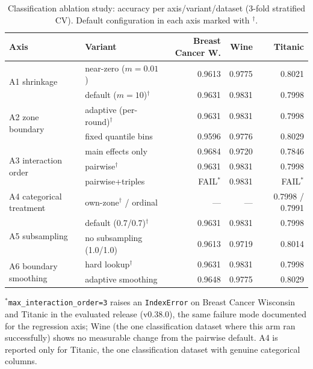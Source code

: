 \documentclass[11pt]{article}
\begin{document}
\begin{table}[t]
\centering
\small
\caption{Classification ablation study: accuracy per axis/variant/dataset
(3-fold stratified CV). Default configuration in each axis marked with
$^\dagger$.}
\label{tab:ablation-clf}
\begin{tabular}{llrrr}
\toprule
Axis & Variant & Breast Cancer W. & Wine & Titanic \\
\midrule
\multirow{2}{*}{A1 shrinkage}
 & near-zero ($m=0.01$)     & 0.9613 & 0.9775 & 0.8021 \\
 & default ($m=10$)$^\dagger$ & 0.9631 & 0.9831 & 0.7998 \\
\midrule
\multirow{2}{*}{A2 zone boundary}
 & adaptive (per-round)$^\dagger$ & 0.9631 & 0.9831 & 0.7998 \\
 & fixed quantile bins       & 0.9596 & 0.9776 & 0.8029 \\
\midrule
\multirow{3}{*}{A3 interaction order}
 & main effects only         & 0.9684 & 0.9720 & 0.7846 \\
 & pairwise$^\dagger$         & 0.9631 & 0.9831 & 0.7998 \\
 & pairwise+triples           & FAIL$^*$ & 0.9831 & FAIL$^*$ \\
\midrule
A4 categorical treatment & own-zone$^\dagger$ / ordinal & --- & --- & 0.7998 / 0.7991 \\
\midrule
\multirow{2}{*}{A5 subsampling}
 & default (0.7/0.7)$^\dagger$ & 0.9631 & 0.9831 & 0.7998 \\
 & no subsampling (1.0/1.0)    & 0.9613 & 0.9719 & 0.8014 \\
\midrule
\multirow{2}{*}{A6 boundary smoothing}
 & hard lookup$^\dagger$       & 0.9631 & 0.9831 & 0.7998 \\
 & adaptive smoothing          & 0.9648 & 0.9775 & 0.8029 \\
\bottomrule
\end{tabular}

\vspace{2pt}
\footnotesize $^*$\texttt{max\_interaction\_order=3} raises an
\texttt{IndexError} on Breast Cancer Wisconsin and Titanic in the
evaluated release (v0.38.0), the same failure mode documented for the
regression axis; Wine (the one classification dataset where this arm ran
successfully) shows no measurable change from the pairwise default. A4 is
reported only for Titanic, the one classification dataset with genuine
categorical columns.
\end{table}
\end{document}
